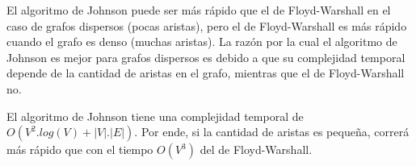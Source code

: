 \documentclass[../tp2_grupo404.tex]{subfiles}
\begin{document}
El algoritmo de Johnson puede ser más rápido que el de Floyd-Warshall en el caso  
de grafos dispersos (pocas aristas), pero el de Floyd-Warshall es más rápido  
cuando el grafo es denso (muchas aristas). La razón por la cual el algoritmo de  
Johnson es mejor para grafos dispersos es debido a que su complejidad temporal  
depende de la cantidad de aristas en el grafo, mientras que el de Floyd-Warshall no. 
\par 
El algoritmo de Johnson tiene una complejidad temporal de $O(V^2.log(V)+|V|.|E|)$.  
Por ende, si la cantidad de aristas es pequeña, correrá más rápido que con el  
tiempo $O(V^3)$ del de Floyd-Warshall.

\end{document}
